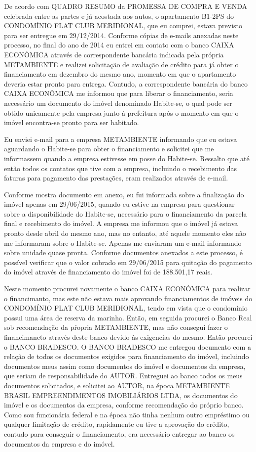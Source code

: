 \documentclass[11pt]{letter}
\begin{document}
De acordo com QUADRO RESUMO da PROMESSA DE COMPRA E VENDA celebrada entre as partes e já acostada aos autos, o apartamento B1-2PS do CONDOMÍNIO FLAT CLUB MERIDIONAL, que eu comprei, estava previsto para ser entregue em 29/12/2014. Conforme cópias de e-mails anexadas neste processo, no final do ano de 2014 eu entrei em contato com o banco CAIXA ECONÔMICA através de correspondente bancária indicada pela própria METAMBIENTE e realizei solicitação de avaliação de crédito para já obter o financiamento em dezembro do mesmo ano, momento em que o apartamento deveria estar pronto para entrega. Contudo, a correspondente bancária do banco CAIXA ECONÔMICA me informou que para liberar o financiamento, seria necessário um documento do imóvel denominado Habite-se, o qual pode ser obtido unicamente pela empresa junto à prefeitura após o momento em que o imóvel encontra-se pronto para ser habitado.

Eu enviei e-mail para a empresa METAMBIENTE informando que eu estava aguardando o Habite-se para obter o financiamento e solicitei que me informassem quando a empresa estivesse em posse do Habite-se. Ressalto que até então todos os contatos que tive com a empresa, incluindo o recebimento das faturas para pagamento das prestações, eram realizados através de e-mail.

Conforme mostra documento em anexo, eu fui informada sobre a finalização do imóvel apenas em 29/06/2015, quando eu estive na empresa para questionar sobre a disponibilidade do Habite-se, necessário para o financiamento da parcela final e recebimento do imóvel. A empresa me informou que o imóvel já estava pronto desde abril do mesmo ano, mas no entanto, até aquele momento eles não me informaram sobre o Habite-se. Apenas me enviaram um e-mail informando sobre unidade quase pronta. Conforme documentos anexados a este processo, é possível verificar que o valor cobrado em 29/06/2015 para quitação do pagamento do imóvel através de financiamento do imóvel foi de 188.501,17 reais.

Neste momento procurei novamente o banco CAIXA ECONÔMICA para realizar o financimanto, mas este não estava mais aprovando financiamentos de imóveis do CONDOMÍNIO FLAT CLUB MERIDIONAL, tendo em vista que o condomínio possui uma área de reserva da marinha. Então, em seguida procurei o Banco Real sob recomendação da pŕopria METAMBIENTE, mas não consegui fazer o financimaneto através deste banco devido às exigencias do mesmo. Então procurei o BANCO BRADESCO. O BANCO BRADESCO me entregou documento com a relação de todos os documentos exigidos para financiamento do imóvel, incluindo documentos meus assim como documentos do imóvel e documentos da empresa, que seriam de responsabilidade do AUTOR. Entreguei ao banco todos os meus documentos solicitados, e solicitei ao AUTOR, na época METAMBIENTE BRASIL EMPREENDIMENTOS IMOBILIÁRIOS LTDA, os documentos do imóvel e os documentos da empresa, conforme recomendação do próprio banco. Como sou funcionária federal e na época não tinha nenhum outro empréstimo ou qualquer limitação de crédito, rapidamente eu tive a aprovação do crédito, contudo para conseguir o financiamento, era necessário entregar ao banco os documentos da empresa e do imóvel.
\end{document}
